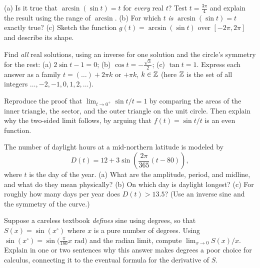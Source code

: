 \begin{exercise}
(a) Is it true that $\arcsin(\sin t) = t$ for \emph{every} real $t$? Test $t = \tfrac{3\pi}{4}$ and explain the result using the range of $\arcsin$.
(b) For which $t$ \emph{is} $\arcsin(\sin t) = t$ exactly true?
(c) Sketch the function $g(t) = \arcsin(\sin t)$ over $[-2\pi, 2\pi]$ and describe its shape.
\end{exercise}

\begin{exercise}
Find \emph{all} real solutions, using an inverse for one solution and the circle's symmetry for the rest:
(a) $2\sin t - 1 = 0$;\quad
(b) $\cos t = -\tfrac{\sqrt3}{2}$;\quad
(c) $\tan t = 1$. Express each answer as a family $t = (\ldots) + 2\pi k$ or $+\pi k$, $k\in\mathbb{Z}$ (here $\mathbb{Z}$ is the set of all integers $\ldots,-2,-1,0,1,2,\ldots$).
\end{exercise}

\begin{exercise}
Reproduce the proof that $\lim_{t\to 0^+}\sin t/t = 1$ by comparing the areas of the inner triangle, the sector, and the outer triangle on the unit circle. Then explain why the two-sided limit follows, by arguing that $f(t) = \sin t/t$ is an even function.
\end{exercise}

\begin{exercise}
The number of daylight hours at a mid-northern latitude is modeled by
\[
  D(t) = 12 + 3\sin\!\left(\frac{2\pi}{365}(t - 80)\right),
\]
where $t$ is the day of the year. (a) What are the amplitude, period, and midline, and what do they mean physically? (b) On which day is daylight longest? (c) For roughly how many days per year does $D(t) > 13.5$? (Use an inverse sine and the symmetry of the curve.)
\end{exercise}

\begin{exercise}
Suppose a careless textbook \emph{defines} sine using degrees, so that $S(x) = \sin(x^\circ)$ where $x$ is a pure number of degrees. Using $\sin(x^\circ) = \sin\!\big(\tfrac{\pi}{180}x \text{ rad}\big)$ and the radian limit, compute $\lim_{x\to0} S(x)/x$. Explain in one or two sentences why this answer makes degrees a poor choice for calculus, connecting it to the eventual formula for the derivative of $S$.
\end{exercise}
